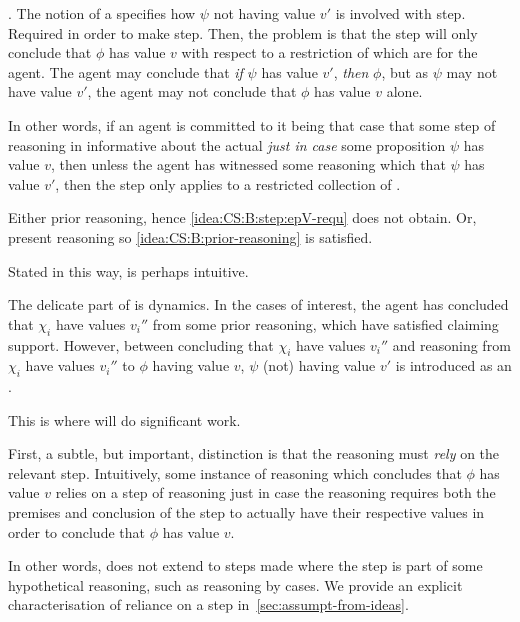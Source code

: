 \begin{note}
  \ideaCS{}.
  The notion of a \requ{} specifies how \(\psi\) not having value \(v'\) is involved with step.
  Required in order to make step.
  Then, the problem is that the step will only conclude that \(\phi\) has value \(v\) with respect to a restriction of  which are \epVAd{} for the agent.
  The agent may conclude that \emph{if} \(\psi\) has value \(v'\), \emph{then} \(\phi\), but as \(\psi\) may not have value \(v'\), the agent may not conclude that \(\phi\) has value \(v\) alone.

  In other words, if an agent is committed to it being that case that some step of reasoning in informative about the actual \world{} \emph{just in case} some proposition \(\psi\) has value \(v\), then unless the agent has witnessed some reasoning which  that \(\psi\) has value \(v'\), then the step only applies to a restricted collection of .

  Either prior reasoning, hence \ref{idea:CS:B:step:epV-requ} does not obtain.
  Or, present reasoning so \ref{idea:CS:B:prior-reasoning} is satisfied.
\end{note}

\begin{note}[Dynamics]
  Stated in this way, \ideaCS{} is perhaps intuitive.

  The delicate part of \ideaCS{} is dynamics.
  In the cases of interest, the agent has concluded that \(\chi_{i}\) have values \(v_{i}''\) from some prior reasoning, which have satisfied claiming support.
  However, between concluding that \(\chi_{i}\) have values \(v_{i}''\) and reasoning from \(\chi_{i}\) have values \(v_{i}''\) to \(\phi\) having value \(v\), \(\psi\) (not) having value \(v'\) is introduced as an \epVN{}.

  This is where \ideaCS{} will do significant work.
\end{note}

\begin{note}[Relying]
  First, a subtle, but important, distinction is that the reasoning must \emph{rely} on the relevant step.
  Intuitively, some instance of reasoning which concludes that \(\phi\) has value \(v\) relies on a step of reasoning just in case the reasoning requires both the premises and conclusion of the step to actually have their respective values in order to conclude that \(\phi\) has value \(v\).

  In other words, \ideaCS{} does not extend to steps made where the step is part of some hypothetical reasoning, such as reasoning by cases.
  We provide an explicit characterisation of reliance on a step in~\autoref{sec:assumpt-from-ideas}.
\end{note}


